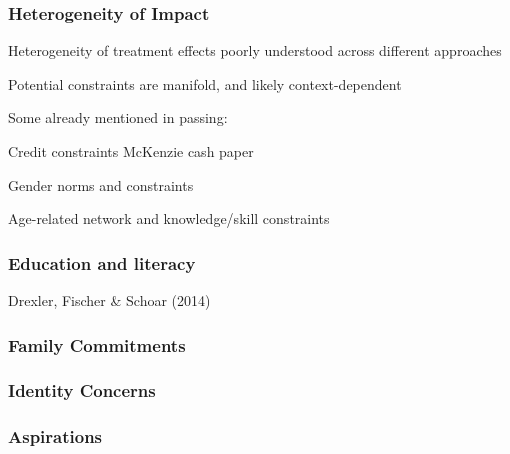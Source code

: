 \documentclass[hideothersubsections, usenames,dvipsnames,11pt]{beamer}
\newenvironment{itemize_3pt}{\itemize\addtolength{\itemsep}{3pt}}{\enditemize}
\begin{document}
\begin{frame}
\frametitle{Heterogeneity of Impact}
	\begin{itemize_3pt}
	\item Heterogeneity of treatment effects poorly understood across different approaches
	\item Potential constraints are manifold, and likely context-dependent
	\item Some already mentioned in passing:
	\begin{itemize_3pt}
		\item Credit constraints \citep[see, e.g.,][]{} McKenzie cash paper
		\item Gender norms and constraints
		\item Age-related network and knowledge/skill constraints
	\end{itemize_3pt} 
	\vspace{0.1in}
	\end{itemize_3pt}
\end{frame}

\begin{frame}
\frametitle{Education and literacy}
	\begin{itemize_3pt}
	\item Drexler, Fischer \& Schoar (2014) \citep{Drexler2014}
	\vspace{0.1in}
	\end{itemize_3pt}
\end{frame}

\begin{frame}
\frametitle{Family Commitments}
	\begin{itemize_3pt}
	\item 
	\vspace{0.1in}
	\end{itemize_3pt}
\end{frame}

\begin{frame}
\frametitle{Identity Concerns}
	\begin{itemize_3pt}
	\item 
	\vspace{0.1in}
	\end{itemize_3pt}
\end{frame}

\begin{frame}
\frametitle{Aspirations}
	\begin{itemize_3pt}
	\item 
	\vspace{0.1in}
	\end{itemize_3pt}
\end{frame}
\end{document}
